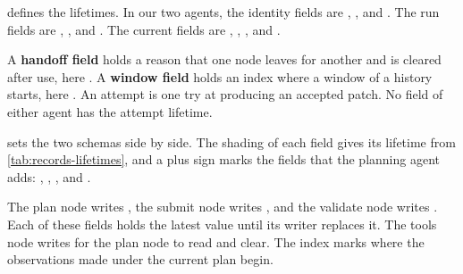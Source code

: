  defines the lifetimes. In our two agents, the identity fields are
, ,  and . The run fields are
, ,  and . The current
fields are , , ,  and
.

A \textbf{handoff field} holds a reason that one node leaves for another and is cleared after use,
here . A \textbf{window field} holds an index where a window of a history
starts, here . An attempt is one try at producing an accepted patch. No field
of either agent has the attempt lifetime.

 sets the two schemas side by side. The shading of each field gives its
lifetime from \cref{tab:records-lifetimes}, and a plus sign marks the fields that the planning agent
adds: , , ,  and
.

The plan node writes , the submit node writes , and the validate node
writes . Each of these fields holds the latest value until its writer replaces
it. The tools node writes  for the plan node to read and clear. The index
 marks where the observations made under the current plan begin.

